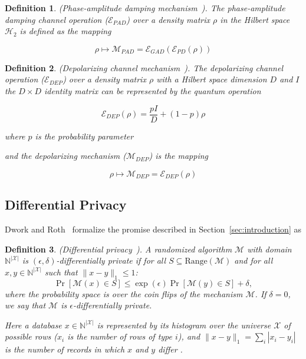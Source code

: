 \documentclass{ieeeaccess}
\newtheorem{definition}{Definition}[section]
\begin{document}
\begin{definition}
    (Phase-amplitude damping mechanism~\cite{zhou2017differential}). The phase-amplitude damping channel operation ($\mathcal{E}_{PAD}$) over a density matrix $\rho$ in the Hilbert space $\mathcal{H}_2$ is defined as the mapping

    \[
      \rho \mapsto \mathcal{M}_{PAD} = \mathcal{E}_{GAD}(\mathcal{E}_{PD}(\rho))
    \]
    \label{def:pad}
\end{definition}

\begin{definition}
  (Depolarizing channel mechanism~\cite{zhou2017differential}). The depolarizing channel operation ($\mathcal{E}_{DEP}$) over a density matrix $\rho$ with a Hilbert space dimension $D$ and $I$ the $D \times D$ identity matrix can be represented by the quantum operation
  
  \[
    \mathcal{E}_{DEP}(\rho) = \frac{pI}{D} + (1-p)\rho
  \]

  where $p$ is the probability parameter

  and the depolarizing mechanism ($\mathcal{M}_{DEP}$) is the mapping

  \[
    \rho \mapsto \mathcal{M}_{DEP} = \mathcal{E}_{DEP}(\rho)
  \]
  \label{def:dep}
\end{definition}


\subsection{Differential Privacy}

Dwork and Roth~\cite{dwork2014algorithmic} formalize the promise described in Section~\ref{sec:introduction} as

\begin{definition}
    (Differential privacy~\cite[Def.~2.4]{dwork2014algorithmic}). A randomized algorithm $\mathcal{M}$ with domain $\mathbb{N}^{|\mathcal{X}|}$ is $(\epsilon, \delta)$-differentially private if for all $S \subseteq \mathrm{Range}(\mathcal{M})$ and for all $x, y \in \mathbb{N}^{|\mathcal{X}|}$ such that $\|x - y\|_1 \leq 1$:
    \[
      \Pr[\mathcal{M}(x) \in S] \leq \exp(\epsilon) \Pr[\mathcal{M}(y) \in S] + \delta,
    \]
    where the probability space is over the coin flips of the mechanism $\mathcal{M}$. If $\delta = 0$, we say that $\mathcal{M}$ is $\epsilon$-differentially private.

    Here a database $x \in \mathbb{N}^{|\mathcal{X}|}$ is represented by its histogram over the universe $\mathcal{X}$ of possible rows ($x_i$ is the number of rows of type $i$), and $\|x - y\|_1 = \sum_{i} |x_i - y_i|$ is the number of records in which $x$ and $y$ differ \cite[Def.~2.3]{dwork2014algorithmic}.
    \label{def:dp}
\end{definition}
\end{document}
